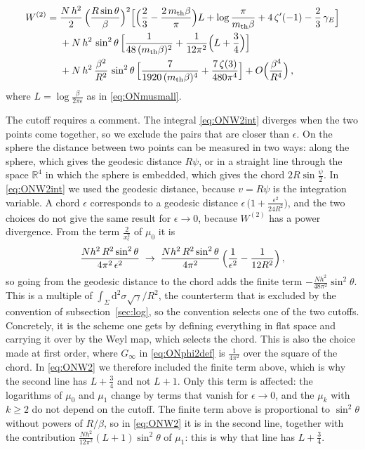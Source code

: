 \documentclass[a4paper,11pt]{article}
\newcommand{\dd}{\mathrm{d}}
\begin{document}
\begin{equation}\label{eq:ONW2}
	\begin{aligned}
		W^{(2)}={}&\frac{N\,h^2}{2}\,\Bigl(\frac{R\sin\theta}{\beta}\Bigr)^{2}\Bigl[\Bigl(\frac23-\frac{2\,m_{\rm th}\beta}{\pi}\Bigr)L+\log\frac{\pi}{m_{\rm th}\beta}+4\,\zeta'(-1)-\frac23\,\gamma_E\Bigr]\\
		&+N\,h^2\,\sin^2\theta\,\Bigl[\frac{1}{48\,(m_{\rm th}\beta)^2}+\frac{1}{12\pi^2}\Bigl(L+\frac34\Bigr)\Bigr]\\
		&+N\,h^2\,\frac{\beta^2}{R^2}\,\sin^2\theta\,\Bigl[\frac{7}{1920\,(m_{\rm th}\beta)^4}+\frac{7\,\zeta(3)}{480\pi^4}\Bigr]+O\Bigl(\frac{\beta^4}{R^4}\Bigr)\, ,
	\end{aligned}
\end{equation}
where $L=\log\tfrac{\beta}{2\pi\epsilon}$ as in \eqref{eq:ONmusmall}.

The cutoff requires a comment. The integral \eqref{eq:ONW2int} diverges when the two points come together, so we exclude the pairs that are closer than $\epsilon$. On the sphere the distance between two points can be measured in two ways: along the sphere, which gives the geodesic distance $R\psi$, or in a straight line through the space $\mathbb{R}^4$ in which the sphere is embedded, which gives the chord $2R\sin\tfrac\psi2$. In \eqref{eq:ONW2int} we used the geodesic distance, because $v=R\psi$ is the integration variable. A chord $\epsilon$ corresponds to a geodesic distance $\epsilon\,\bigl(1+\tfrac{\epsilon^2}{24R^2}\bigr)$, and the two choices do not give the same result for $\epsilon\to0$, because $W^{(2)}$ has a power divergence. From the term $\tfrac{2}{x_\epsilon^2}$ of $\mu_0$ it is
\begin{equation}
	\frac{N h^2\,R^2\sin^2\theta}{4\pi^2\,\epsilon^2}\;\to\;\frac{N h^2\,R^2\sin^2\theta}{4\pi^2}\,\Bigl(\frac{1}{\epsilon^2}-\frac{1}{12R^2}\Bigr)\, ,
\end{equation}
so going from the geodesic distance to the chord adds the finite term $-\tfrac{N h^2}{48\pi^2}\sin^2\theta$. This is a multiple of $\int_\Sigma\dd^2\sigma\sqrt\gamma/R^2$, the counterterm that is excluded by the convention of subsection~\ref{sec:log}, so the convention selects one of the two cutoffs. Concretely, it is the scheme one gets by defining everything in flat space and carrying it over by the Weyl map, which selects the chord. This is also the choice made at first order, where $G_\infty$ in \eqref{eq:ONphi2def} is $\tfrac{1}{4\pi^2}$ over the square of the chord. In \eqref{eq:ONW2} we therefore included the finite term above, which is why the second line has $L+\tfrac34$ and not $L+1$. 	Only this term is affected: the logarithms of $\mu_0$ and $\mu_1$ change by terms that vanish for $\epsilon\to0$, and the $\mu_k$ with $k\ge2$ do not depend on the cutoff. The finite term above is proportional to $\sin^2\theta$ without powers of $R/\beta$, so in \eqref{eq:ONW2} it is in the second line, together with the contribution $\tfrac{N h^2}{12\pi^2}(L+1)\sin^2\theta$ of $\mu_1$: this is why that line has $L+\tfrac34$.
\end{document}
